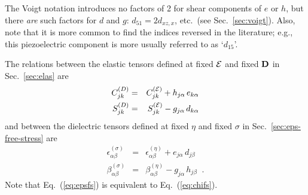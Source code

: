\documentclass[11pt,fleqn]{article}
\def\bea{\begin{eqnarray}}
\def\eea{\end{eqnarray}}
\def\E{{\cal E}}
\def\D{{\bf D}}
\def\eps{\epsilon}
\begin{document}
The Voigt notation introduces no factors of 2 for shear components
of $e$ or $h$, but there {\it are} such factors for $d$ and $g$:
$d_{51}=2d_{xz,x}$, etc.~(see Sec.~\ref{sec:voigt}).  Also, note that
it is more common to find the indices reversed in the literature;
e.g., this piezoelectric component is more usually referred to as
`$d_{15}$'.

The relations between the elastic tensors defined at fixed $\E$
and fixed $\D$ in Sec.~\ref{sec:elas} are
%
\bea
C^{(D)}_{jk}&=&C^{(\E)}_{jk}+h_{j\alpha}\,e_{k\alpha}
\\
S^{(D)}_{jk}&=&S^{(\E)}_{jk}-g_{j\alpha}\,d_{k\alpha}
\eea
%
and between the dielectric tensors defined at fixed $\eta$
and fixed $\sigma$ in Sec.~\ref{sec:eps-free-stress} are
%
\bea
 \eps^{(\sigma)}_{\alpha\beta}&=&
 \eps^{(\eta)}_{\alpha\beta}+e_{j\alpha}\,d_{j\beta}
\label{eq:epsfs}
\\
 \beta^{(\sigma)}_{\alpha\beta}&=&
 \beta^{(\eta)}_{\alpha\beta}-g_{j\alpha}\,h_{j\beta}
\;\;.
\eea
%
Note that Eq.~(\ref{eq:epsfs}) is equivalent to Eq.~(\ref{eq:chifs}).
\end{document}
